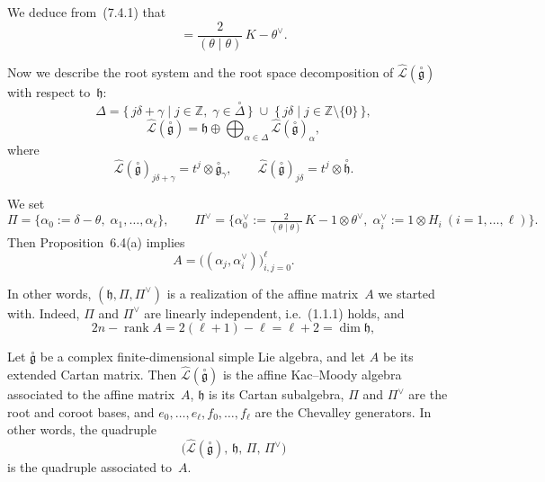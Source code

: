 \documentclass[12pt]{article}
\begin{document}
We deduce from~(7.4.1) that
\begin{equation}
    [E_0, F_0] = \frac{2}{(\theta\mid\theta)}\,K - \theta^\vee.
    \tag{7.4.2}
\end{equation}

Now we describe the root system and the root space decomposition of
$\widehat{\mathcal{L}}(\overset{\circ}{\mathfrak{g}})$ with respect to~$\mathfrak{h}$:
\[
    \Delta = \{\, j\delta + \gamma \mid j \in \mathbb{Z},\; \gamma \in \overset{\circ}{\Delta}\,\}
    \;\cup\;
    \{\, j\delta \mid j \in \mathbb{Z}\setminus\{0\}\,\},
\]
\[
    \widehat{\mathcal{L}}(\overset{\circ}{\mathfrak{g}})
    = \mathfrak{h} \oplus
    \bigoplus_{\alpha \in \Delta}
    \widehat{\mathcal{L}}(\overset{\circ}{\mathfrak{g}})_\alpha,
\]
where
\[
    \widehat{\mathcal{L}}(\overset{\circ}{\mathfrak{g}})_{j\delta+\gamma}
    = t^j \otimes \overset{\circ}{\mathfrak{g}}_\gamma,
    \qquad
    \widehat{\mathcal{L}}(\overset{\circ}{\mathfrak{g}})_{j\delta}
    = t^j \otimes \overset{\circ}{\mathfrak{h}}.
\]

We set
\[
    \Pi = \{\alpha_0 := \delta - \theta,\; \alpha_1,\dots,\alpha_\ell\},
    \qquad
    \Pi^\vee = \{\alpha_0^\vee := \tfrac{2}{(\theta\mid\theta)}\,K - 1\otimes\theta^\vee,\;
    \alpha_i^\vee := 1\otimes H_i \ (i=1,\dots,\ell)\}.
\]
Then Proposition~6.4(a) implies
\begin{equation}
    A = \big((\alpha_j,\alpha_i^\vee)\big)_{i,j=0}^\ell.
    \tag{7.4.3}
\end{equation}

In other words, $(\mathfrak{h}, \Pi, \Pi^\vee)$ is a realization of the affine matrix~$A$ we started with.
Indeed, $\Pi$ and $\Pi^\vee$ are linearly independent, i.e.~(1.1.1) holds, and
\[
    2n - \operatorname{rank}A = 2(\ell + 1) - \ell = \ell + 2 = \dim \mathfrak{h},
\]

\begin{theorem}[7.4]
    Let $\overset{\circ}{\mathfrak{g}}$ be a complex finite-dimensional simple Lie algebra,
    and let $A$ be its extended Cartan matrix.
    Then $\widehat{\mathcal{L}}(\overset{\circ}{\mathfrak{g}})$ is the affine Kac–Moody algebra
    associated to the affine matrix~$A$, $\mathfrak{h}$ is its Cartan subalgebra,
    $\Pi$ and $\Pi^\vee$ are the root and coroot bases, and
    $e_0,\dots,e_\ell, f_0,\dots,f_\ell$ are the Chevalley generators.
    In other words, the quadruple
    \[
        \big(\widehat{\mathcal{L}}(\overset{\circ}{\mathfrak{g}}),\,
        \mathfrak{h},\, \Pi,\, \Pi^\vee\big)
    \]
    is the quadruple associated to~$A$.
\end{theorem}
\end{document}
